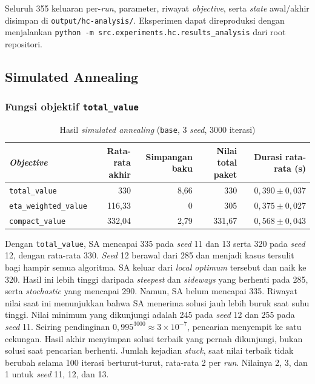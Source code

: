 Seluruh 355 keluaran per-\textit{run}, parameter, riwayat \textit{objective}, serta \textit{state} awal/akhir disimpan di \texttt{output/hc-analysis/}. Eksperimen dapat direproduksi dengan menjalankan \texttt{python -m src.experiments.hc.results\_analysis} dari root repositori.


\subsection{Simulated Annealing}

\subsubsection{Fungsi objektif \texttt{total\_value}}
\begin{table}[H]
    \centering
    \begin{tabular}{@{}lrrrr@{}}
        \toprule
        \textit{Objective}            & Rata-rata akhir & Simpangan baku & Nilai total paket & Durasi rata-rata (s)  \\
        \midrule
        \texttt{total\_value}         & 330             & 8,66           & 330               & $0{,}390 \pm 0{,}037$ \\
        \texttt{eta\_weighted\_value} & 116,33          & 0              & 305               & $0{,}375 \pm 0{,}027$ \\
        \texttt{compact\_value}       & 332,04          & 2,79           & 331,67            & $0{,}568 \pm 0{,}043$ \\
        \bottomrule
    \end{tabular}
    \caption{Hasil \textit{simulated annealing} (\texttt{base}, 3 \textit{seed}, 3000 iterasi)}
    \label{tab:sa}
\end{table}

Dengan \texttt{total\_value}, SA mencapai 335 pada \textit{seed} 11 dan 13 serta 320 pada \textit{seed} 12, dengan rata-rata 330. \textit{Seed} 12 berawal dari 285 dan menjadi kasus tersulit bagi hampir semua algoritma. SA keluar dari \textit{local optimum} tersebut dan naik ke 320. Hasil ini lebih tinggi daripada \textit{steepest} dan \textit{sideways} yang berhenti pada 285, serta \textit{stochastic} yang mencapai 290. Namun, SA belum mencapai 335. Riwayat nilai saat ini menunjukkan bahwa SA menerima solusi jauh lebih buruk saat suhu tinggi. Nilai minimum yang dikunjungi adalah 245 pada \textit{seed} 12 dan 255 pada \textit{seed} 11. Seiring pendinginan $0{,}995^{3000}\approx 3\times10^{-7}$, pencarian menyempit ke satu cekungan. Hasil akhir menyimpan solusi terbaik yang pernah dikunjungi, bukan solusi saat pencarian berhenti. Jumlah kejadian \textit{stuck}, saat nilai terbaik tidak berubah selama 100 iterasi berturut-turut, rata-rata 2 per \textit{run}. Nilainya 2, 3, dan 1 untuk \textit{seed} 11, 12, dan 13.

